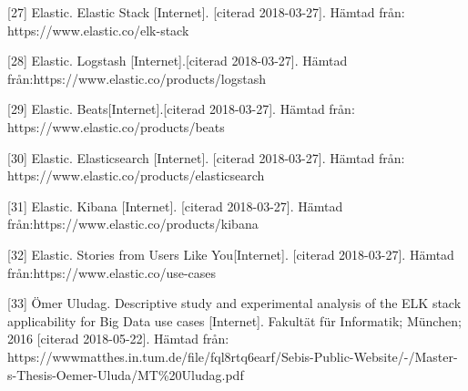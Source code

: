 \documentclass[12pt]{kththesis}
\begin{document}
[27] Elastic. Elastic Stack [Internet]. [citerad 2018-03-27]. Hämtad från:
https://www.elastic.co/elk-stack 

[28] Elastic. Logstash [Internet].[citerad 2018-03-27]. Hämtad från:\newline https://www.elastic.co/products/logstash

[29] Elastic. Beats[Internet].[citerad 2018-03-27]. Hämtad från: \newline https://www.elastic.co/products/beats

[30] Elastic. Elasticsearch [Internet]. [citerad 2018-03-27]. Hämtad från: https://www.elastic.co/products/elasticsearch

[31] Elastic. Kibana [Internet]. [citerad 2018-03-27]. Hämtad från:\newline  https://www.elastic.co/products/kibana 

[32] Elastic. Stories from Users Like You[Internet]. [citerad 2018-03-27]. Hämtad från:\newline https://www.elastic.co/use-cases

[33] Ömer Uludag. Descriptive study and experimental analysis of the ELK stack applicability for Big Data use cases [Internet]. Fakultät für Informatik; München; 2016 [citerad 2018-05-22]. Hämtad från: \newline https://wwwmatthes.in.tum.de/file/fql8rtq6earf/Sebis-Public-Website/-/Master-s-Thesis-Oemer-Uluda/MT\%20Uludag.pdf
\end{document}
